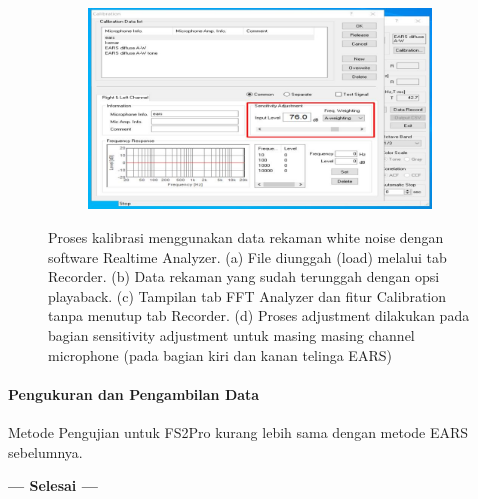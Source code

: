 \documentclass{article}
\begin{document}
\begin{figure}[H]
\begin{subfigure}[]{.45\textwidth}
			\caption{}
		\end{subfigure}
		\begin{subfigure}[]{.45\textwidth}
			\includegraphics[width=\textwidth]{images/dengung/rta_calib3}
			\caption{}
		\end{subfigure}
		\caption{Proses kalibrasi menggunakan data rekaman white noise dengan software Realtime Analyzer. (a)
			File diunggah (load) melalui tab Recorder. (b) Data rekaman yang sudah terunggah dengan opsi playaback.
			(c) Tampilan tab FFT Analyzer dan fitur Calibration tanpa menutup tab Recorder. (d) Proses adjustment
			dilakukan pada bagian sensitivity adjustment untuk masing masing channel microphone (pada bagian kiri dan
			kanan telinga EARS)}
		\label{fig:Load Kalibrasi Ruang Dengung}
	\end{figure}

	\paragraph{Pengukuran dan Pengambilan Data}
	
	Metode Pengujian untuk FS2Pro kurang lebih sama dengan metode EARS sebelumnya.
	
	\vspace{30pt}\centering \textbf{--- Selesai ---}
\end{document}

